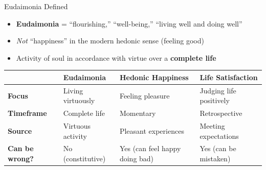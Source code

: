 \documentclass[aspectratio=169]{beamer}
\begin{document}
\begin{frame}{Eudaimonia Defined}
\begin{itemize}
    \item \textbf{Eudaimonia} = ``flourishing,'' ``well-being,'' ``living well and doing well''
    \item \textit{Not} ``happiness'' in the modern hedonic sense (feeling good)
    \item Activity of soul in accordance with virtue over a \textbf{complete life}
\end{itemize}

\vspace{0.3cm}
\begin{table}[h]
\centering
\small
\begin{tabular}{>{\bfseries}l p{3.5cm} p{3.5cm} p{3.5cm}}
\toprule
& \textbf{Eudaimonia} & \textbf{Hedonic Happiness} & \textbf{Life Satisfaction} \\
\midrule
Focus & Living virtuously & Feeling pleasure & Judging life positively \\
Timeframe & Complete life & Momentary & Retrospective \\
Source & Virtuous activity & Pleasant experiences & Meeting expectations \\
Can be wrong? & No (constitutive) & Yes (can feel happy doing bad) & Yes (can be mistaken) \\
\bottomrule
\end{tabular}
\end{table}
\end{frame}
\end{document}
